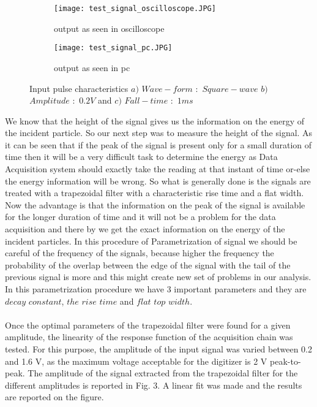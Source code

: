 \documentclass[a4paper, 11pt]{article}
\begin{document}
\begin{figure}[h]
 
\begin{subfigure}{0.5\textwidth}
\texttt{[image: test\_signal\_oscilloscope.JPG]} 
\caption{output as seen in oscilloscope}
\label{fig:subim1}
\end{subfigure}
\begin{subfigure}{0.5\textwidth}
\texttt{[image: test\_signal\_pc.JPG]}
\caption{output as seen in pc}
\label{fig:subim2}
\end{subfigure}
 
\caption{Input pulse characteristics $a)$ $Wave-form$ $:$ $Square-wave$ \newline $b)$ $Amplitude$ $:$ $0.2V$ and $c)$ $Fall-time$ $:$ $1ms$}
\label{fig:image2}
\end{figure}


We know that the height of the signal gives us the information on the energy of the incident particle. So our next step was to measure the  height of the signal. As it can be seen that if the peak of the signal is present only for a small duration of time then it will be a very difficult task to determine the energy as Data Acquisition system should exactly take the reading at that instant of time or-else the energy information will be wrong. So what is generally done is the signals are treated with a trapezoidal filter with a characteristic rise time and a flat width. Now the advantage is that the information on the peak of the signal is available for the longer duration of time and it will not be a problem for the data acquisition and there by we get the exact information on the energy of the incident particles.
In this procedure of Parametrization of signal we should be careful of the frequency of the signals, because higher the frequency the probability of the overlap between the edge of the signal with the tail of the previous signal is more and this might create new set of problems in our analysis.  In this parametrization procedure we have 3 important parameters and they are $decay$ $constant$, $the$ $rise$ $time$ and $flat$ $top$ $width$.
\paragraph{}
Once the optimal parameters of the trapezoidal filter were found for a given amplitude, the linearity of the response function of the acquisition chain was tested. For this purpose, the amplitude of the input signal was varied between 0.2 and 1.6 V, as the maximum voltage acceptable for the  digitizer is 2 V peak-to-peak. The amplitude of the signal extracted from the trapezoidal filter for the different amplitudes is reported in Fig. 3. A linear fit was made and the results are reported on the figure. 
\end{document}
